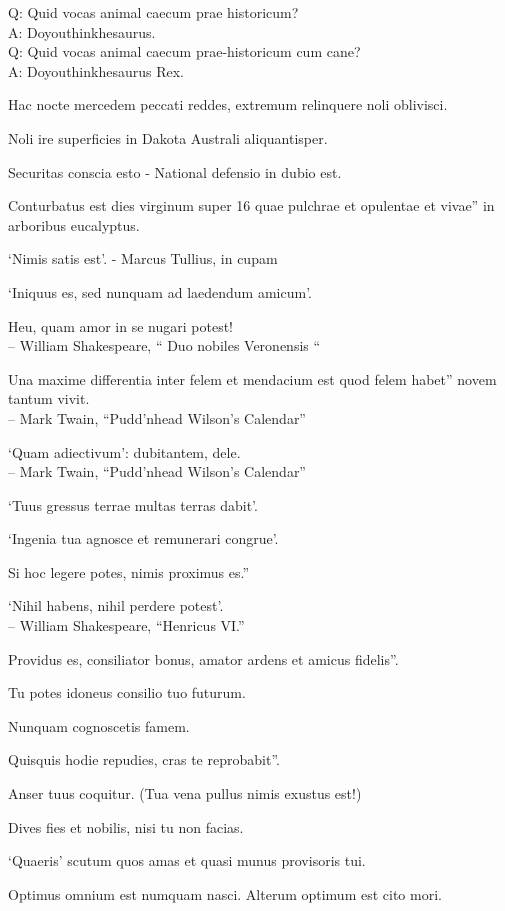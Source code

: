 \documentclass[titlepage,12pt]{memoir}
\begin{document}
Q: Quid vocas animal caecum prae historicum?\\
A: Doyouthinkhesaurus.\\
Q: Quid vocas animal caecum prae-historicum cum cane?\\
A: Doyouthinkhesaurus Rex.

 Hac nocte mercedem peccati reddes, extremum relinquere noli oblivisci.

Noli ire superficies in Dakota Australi aliquantisper.

Securitas conscia esto - National defensio in dubio est.

Conturbatus est dies virginum super 16 quae pulchrae et opulentae et vivae”
in arboribus eucalyptus.

‘Nimis satis est’.
- Marcus Tullius, in cupam

‘Iniquus es, sed nunquam ad laedendum amicum’.

Heu, quam amor in se nugari potest!
\\-- William Shakespeare, “ Duo nobiles Veronensis “

Una maxime differentia inter felem et mendacium est quod felem habet”
novem tantum vivit.
\\-- Mark Twain, “Pudd’nhead Wilson’s Calendar”

‘Quam adiectivum’: dubitantem, dele.
\\-- Mark Twain, “Pudd’nhead Wilson’s Calendar”

‘Tuus gressus terrae multas terras dabit’.

‘Ingenia tua agnosce et remunerari congrue’.

Si hoc legere potes, nimis proximus es.”

‘Nihil habens, nihil perdere potest’.
\\-- William Shakespeare, “Henricus VI.”

Providus es, consiliator bonus, amator ardens et amicus fidelis”.

Tu potes idoneus consilio tuo futurum.

Nunquam cognoscetis famem.

Quisquis hodie repudies, cras te reprobabit”.

Anser tuus coquitur.
(Tua vena pullus nimis exustus est!)

 Dives fies et nobilis, nisi tu non facias.

‘Quaeris’ scutum quos amas et quasi munus provisoris tui.

Optimus omnium est numquam nasci. Alterum optimum est cito mori.
\end{document}
